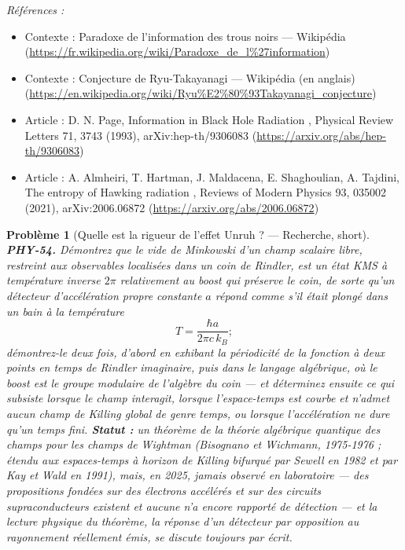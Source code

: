 \documentclass[11pt]{article}
\newtheorem{problem}{Problème}
\newenvironment{refs}{\par\small\noindent\emph{Références :}\begin{itemize}\setlength\itemsep{0pt}}{\end{itemize}\normalsize}
\begin{document}
\begin{refs}
\item Contexte : Paradoxe de l'information des trous noirs --- Wikipédia (\url{https://fr.wikipedia.org/wiki/Paradoxe_de_l%27information})
\item Contexte : Conjecture de Ryu-Takayanagi --- Wikipédia (en anglais) (\url{https://en.wikipedia.org/wiki/Ryu%E2%80%93Takayanagi_conjecture})
\item Article : D. N. Page, \og{} Information in Black Hole Radiation \fg{}, Physical Review Letters 71, 3743 (1993), arXiv:hep-th/9306083 (\url{https://arxiv.org/abs/hep-th/9306083})
\item Article : A. Almheiri, T. Hartman, J. Maldacena, E. Shaghoulian, A. Tajdini, \og{} The entropy of Hawking radiation \fg{}, Reviews of Modern Physics 93, 035002 (2021), arXiv:2006.06872 (\url{https://arxiv.org/abs/2006.06872})
\end{refs}

\bigskip

\begin{problem}[{Quelle est la rigueur de l'effet Unruh ? --- Recherche, short}]
\textbf{PHY-54.} Démontrez que le vide de Minkowski d'un champ scalaire libre,
restreint aux observables localisées dans un coin de Rindler, est un état KMS à température inverse
$2\pi$ relativement au boost qui préserve le coin, de sorte qu'un détecteur d'accélération propre
constante $a$ répond comme s'il était plongé dans un bain à la température
\[ T = \frac{\hbar a}{2\pi c\,k_B}; \]
démontrez-le deux fois, d'abord en exhibant la périodicité de la fonction à deux points en temps de
Rindler imaginaire, puis dans le langage algébrique, où le boost est le groupe modulaire de
l'algèbre du coin --- et déterminez ensuite ce qui subsiste lorsque le champ interagit, lorsque
l'espace-temps est courbe et n'admet aucun champ de Killing global de genre temps, ou lorsque
l'accélération ne dure qu'un temps fini. \textbf{Statut :} un théorème de la théorie algébrique
quantique des champs pour les champs de Wightman (Bisognano et Wichmann, 1975-1976 ; étendu aux
espaces-temps à horizon de Killing bifurqué par Sewell en 1982 et par Kay et Wald en 1991), mais,
en 2025, jamais observé en laboratoire --- des propositions fondées sur des électrons accélérés et
sur des circuits supraconducteurs existent et aucune n'a encore rapporté de détection --- et la
lecture physique du théorème, la réponse d'un détecteur par opposition au rayonnement réellement
émis, se discute toujours par écrit.
\end{problem}
\end{document}
